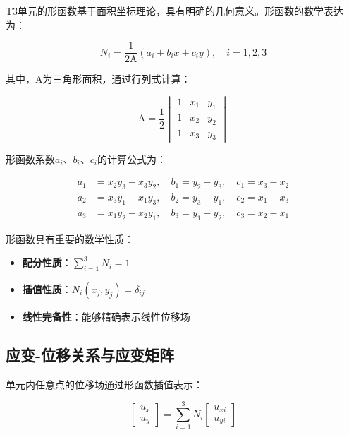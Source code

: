 \documentclass[12pt,a4paper]{article}
\newcommand{\A}{\mathrm{A}}           %
\begin{document}
T3单元的形函数基于面积坐标理论，具有明确的几何意义。形函数的数学表达为：

\begin{equation}
N_i = \frac{1}{2\A}(a_i + b_i x + c_i y), \quad i=1,2,3
\end{equation}

其中，$\A$为三角形面积，通过行列式计算：

\begin{equation}
\A = \frac{1}{2}\begin{vmatrix}
1 & x_1 & y_1 \\
1 & x_2 & y_2 \\
1 & x_3 & y_3
\end{vmatrix}
\end{equation}

形函数系数$a_i$、$b_i$、$c_i$的计算公式为：

\begin{align}
a_1 &= x_2y_3 - x_3y_2, \quad b_1 = y_2 - y_3, \quad c_1 = x_3 - x_2 \\
a_2 &= x_3y_1 - x_1y_3, \quad b_2 = y_3 - y_1, \quad c_2 = x_1 - x_3 \\
a_3 &= x_1y_2 - x_2y_1, \quad b_3 = y_1 - y_2, \quad c_3 = x_2 - x_1
\end{align}

形函数具有重要的数学性质：
\begin{itemize}
    \item \textbf{配分性质}：$\sum_{i=1}^3 N_i = 1$
    \item \textbf{插值性质}：$N_i(x_j, y_j) = \delta_{ij}$
    \item \textbf{线性完备性}：能够精确表示线性位移场
\end{itemize}

\subsection{应变-位移关系与应变矩阵}

单元内任意点的位移场通过形函数插值表示：

\begin{equation}
\begin{bmatrix} u_x \\ u_y \end{bmatrix} = \sum_{i=1}^{3} N_i \begin{bmatrix} u_{xi} \\ u_{yi} \end{bmatrix}
\end{equation}
\end{document}
